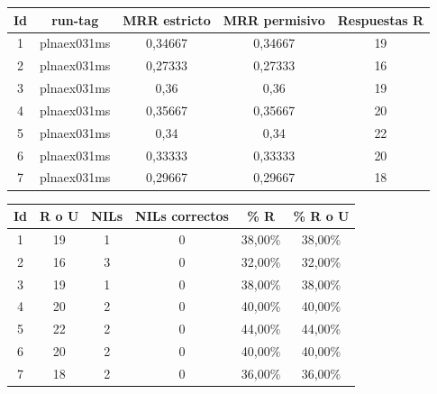 \documentclass[12pt,a4paper,titlepage]{article}
\begin{document}
\begin{table}[h!]
\begin{center}
\begin{tabular}{|c|c|c|c|c|}
\hline
Id & run-tag & MRR estricto & MRR permisivo & Respuestas R\\ \hline
1 & plnaex031ms & 0,34667 & 0,34667 & 19\\ \hline
2 & plnaex031ms & 0,27333 & 0,27333 & 16\\ \hline
3 & plnaex031ms & 0,36 & 0,36 & 19\\ \hline
4 & plnaex031ms & 0,35667 & 0,35667 & 20\\ \hline
5 & plnaex031ms & 0,34 & 0,34 & 22\\ \hline
6 & plnaex031ms & 0,33333 & 0,33333 & 20\\ \hline
7 & plnaex031ms & 0,29667 & 0,29667 & 18\\ \hline
\end{tabular}
\end{center}
\end{table}

\begin{table}[h!]
\begin{center}
\begin{tabular}{|c|c|c|c|c|c|}
\hline
Id & R o U & NILs & NILs correctos & \% R & \% R o U\\ \hline
1 & 19 & 1 & 0 & 38,00\% & 38,00\% \\ \hline
2 & 16 & 3 & 0 & 32,00\% & 32,00\% \\ \hline
3 & 19 & 1 & 0 & 38,00\% & 38,00\% \\ \hline
4 & 20 & 2 & 0 & 40,00\% & 40,00\% \\ \hline
5 & 22 & 2 & 0 & 44,00\% & 44,00\% \\ \hline
6 & 20 & 2 & 0 & 40,00\% & 40,00\% \\ \hline
7 & 18 & 2 & 0 & 36,00\% & 36,00\% \\ \hline
\end{tabular}
\end{center}
\end{table}


\clearpage
\end{document}
